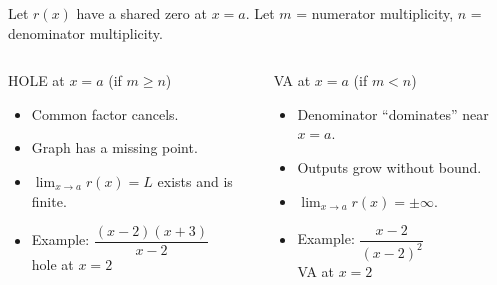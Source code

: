 \documentclass[aspectratio=169, 11pt]{beamer}
\begin{document}
\begin{frame}[t, plain]

  Let $r(x)$ have a shared zero at $x = a$. Let $m$ = numerator multiplicity, $n$ = denominator multiplicity.

  \bigskip
  \begin{columns}[T]
      \begin{block}{HOLE at $x = a$ \quad (if $m \geq n$)}
        \begin{itemize}\setlength{\itemsep}{5pt}
          \item Common factor cancels.
          \item Graph has a missing point.
          \item $\lim_{x \to a} r(x) = L$ exists and is finite.
          \item Example: $\dfrac{(x-2)(x+3)}{x-2}$ \\ hole at $x = 2$
        \end{itemize}
      \end{block}

      \begin{block}{VA at $x = a$ \quad (if $m < n$)}
        \begin{itemize}\setlength{\itemsep}{5pt}
          \item Denominator ``dominates'' near $x = a$.
          \item Outputs grow without bound.
          \item $\lim_{x \to a} r(x) = \pm\infty$.
          \item Example: $\dfrac{x-2}{(x-2)^2}$ \\ VA at $x = 2$
        \end{itemize}
      \end{block}
  \end{columns}
\end{frame}
\end{document}
